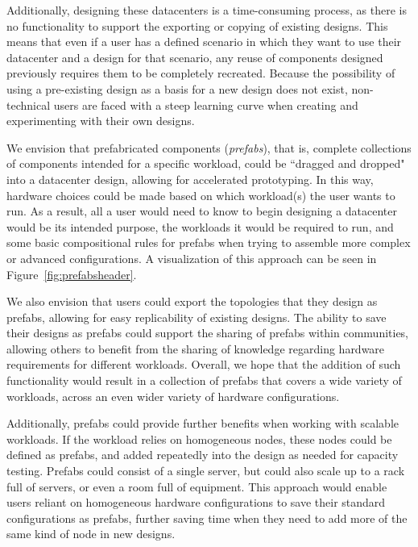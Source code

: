 \documentclass[11pt]{article}
\begin{document}
		Additionally, designing these datacenters is a time-consuming process, as there is no functionality to support the exporting or copying of existing designs.
		This means that even if a user has a defined scenario in which they want to use their datacenter and a design for that scenario, any reuse of components designed previously requires them to be completely recreated.
		Because the possibility of using a pre-existing design as a basis for a new design does not exist, non-technical users are faced with a steep learning curve when creating and experimenting with their own designs. 
		
		We envision that prefabricated components (\textit{prefabs}), that is, complete collections of components intended for a specific workload, could be ``dragged and dropped" into a datacenter design, allowing for accelerated prototyping.
		In this way, hardware choices could be made based on which workload(s) the user wants to run.
		As a result, all a user would need to know to begin designing a datacenter would be its intended purpose, the workloads it would be required to run, and some basic compositional rules for prefabs when trying to assemble more complex or advanced configurations.
		A visualization of this approach can be seen in Figure~\ref{fig:prefabsheader}.

		We also envision that users could export the topologies that they design as prefabs, allowing for easy replicability of existing designs.
		The ability to save their designs as prefabs could support the sharing of prefabs within communities, allowing others to benefit from the sharing of knowledge regarding hardware requirements for different workloads.
		Overall, we hope that the addition of such functionality would result in a collection of prefabs that covers a wide variety of workloads, across an even wider variety of hardware configurations.

		Additionally, prefabs could provide further benefits when working with scalable workloads.
		If the workload relies on homogeneous nodes, these nodes could be defined as prefabs, and added repeatedly into the design as needed for capacity testing.
		Prefabs could consist of a single server, but could also scale up to a rack full of servers, or even a room full of equipment.
		This approach would enable users reliant on homogeneous hardware configurations to save their standard configurations as prefabs, further saving time when they need to add more of the same kind of node in new designs.
	
\end{document}
